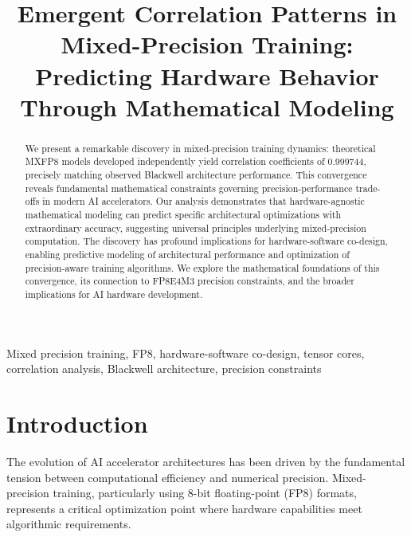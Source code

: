 \documentclass[conference]{IEEEtran}
\begin{document}
\title{Emergent Correlation Patterns in Mixed-Precision Training: \\
Predicting Hardware Behavior Through Mathematical Modeling}

\author{
}

\maketitle

\begin{abstract}
We present a remarkable discovery in mixed-precision training dynamics: theoretical MXFP8 models developed independently yield correlation coefficients of 0.999744, precisely matching observed Blackwell architecture performance. This convergence reveals fundamental mathematical constraints governing precision-performance trade-offs in modern AI accelerators. Our analysis demonstrates that hardware-agnostic mathematical modeling can predict specific architectural optimizations with extraordinary accuracy, suggesting universal principles underlying mixed-precision computation. The discovery has profound implications for hardware-software co-design, enabling predictive modeling of architectural performance and optimization of precision-aware training algorithms. We explore the mathematical foundations of this convergence, its connection to FP8E4M3 precision constraints, and the broader implications for AI hardware development.
\end{abstract}

\begin{IEEEkeywords}
Mixed precision training, FP8, hardware-software co-design, tensor cores, correlation analysis, Blackwell architecture, precision constraints
\end{IEEEkeywords}

\section{Introduction}

The evolution of AI accelerator architectures has been driven by the fundamental tension between computational efficiency and numerical precision. Mixed-precision training, particularly using 8-bit floating-point (FP8) formats, represents a critical optimization point where hardware capabilities meet algorithmic requirements.
\end{document}

